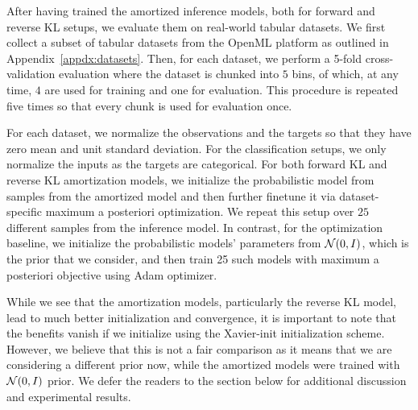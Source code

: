 After having trained the amortized inference models, both for forward and reverse KL setups, we evaluate them on real-world tabular datasets. We first collect a subset of tabular datasets from the OpenML platform as outlined in Appendix~\ref{appdx:datasets}. Then, for each dataset, we perform a 5-fold cross-validation evaluation where the dataset is chunked into $5$ bins, of which, at any time, $4$ are used for training and one for evaluation. This procedure is repeated five times so that every chunk is used for evaluation once.

For each dataset, we normalize the observations and the targets so that they have zero mean and unit standard deviation. For the classification setups, we only normalize the inputs as the targets are categorical. For both forward KL and reverse KL amortization models, we initialize the probabilistic model from samples from the amortized model and then further finetune it via dataset-specific maximum a posteriori optimization. We repeat this setup over $25$ different samples from the inference model. In contrast, for the optimization baseline, we initialize the probabilistic models' parameters from ${\mathcal{N}}(0, I)$, which is the prior that we consider, and then train 25 such models with maximum a posteriori objective using Adam optimizer. 

While we see that the amortization models, particularly the reverse KL model, lead to much better initialization and convergence, it is important to note that the benefits vanish if we initialize using the Xavier-init initialization scheme. However, we believe that this is not a fair comparison as it means that we are considering a different prior now, while the amortized models were trained with ${\mathcal{N}}(0, I)$ prior. We defer the readers to the section below for additional discussion and experimental results.
